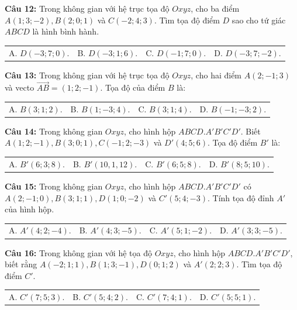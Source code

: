 \documentclass[12pt]{article}
\begin{document}
	\vspace{2mm}
	\noindent \textbf{Câu 12:} Trong không gian với hệ trục tọa độ $Oxyz$, cho ba điểm $A(1; 3; -2), B(2; 0; 1)$ và $C(-2; 4; 3)$. Tìm tọa độ điểm $D$ sao cho tứ giác $ABCD$ là hình bình hành. \\
	\noindent
	\begin{tabular}{p{} p{} p{} p{}}
		A. $D(-3; 7; 0)$. & B. $D(-3; 1; 6)$. & C. $D(-1; 7; 0)$. & D. $D(-3; 7; -2)$.
	\end{tabular}
	
	\vspace{2mm}
	\noindent \textbf{Câu 13:} Trong không gian với hệ trục tọa độ $Oxyz$, cho hai điểm $A(2; -1; 3)$ và vecto $\vec{AB} = (1; 2; -1)$. Tọa độ của điểm $B$ là: \\
	\noindent
	\begin{tabular}{p{} p{} p{} p{}}
		A. $B(3; 1; 2)$. & B. $B(1; -3; 4)$. & C. $B(3; 1; 4)$. & D. $B(-1; -3; 2)$.
	\end{tabular}
	
	\vspace{2mm}
	\noindent \textbf{Câu 14:} Trong không gian $Oxyz$, cho hình hộp $ABCD.A'B'C'D'$. Biết $A(1; 2; -1), B(3; 0; 1), C(-1; 2; -3)$ và $D'(4; 5; 6)$. Tọa độ điểm $B'$ là: \\
	\noindent
	\begin{tabular}{p{} p{} p{} p{}}
		A. $B'(6; 3; 8)$. & B. $B'(10,1,12)$. & C. $B'(6; 5; 8)$. & D. $B'(8; 5; 10)$.
	\end{tabular}
	
	\vspace{2mm}
	\noindent \textbf{Câu 15:} Trong không gian $Oxyz$, cho hình hộp $ABCD.A'B'C'D'$ có $A(2; -1; 0), B(3; 1; 1), D(1; 0; -2)$ và $C'(5; 4; -3)$. Tính tọa độ đỉnh $A'$ của hình hộp. \\
	\noindent
	\begin{tabular}{p{} p{} p{} p{}}
		A. $A'(4; 2; -4)$. & B. $A'(4; 3; -5)$. & C. $A'(5;1;-2)$. & D. $A'(3; 3; -5)$.
	\end{tabular}
	
	\vspace{2mm}
	\noindent \textbf{Câu 16:} Trong không gian với hệ tọa độ $Oxyz$, cho hình hộp $ABCD.A'B'C'D'$, biết rằng $A(-2; 1; 1), B(1; 3; -1), D(0; 1; 2)$ và $A'(2; 2; 3)$. Tìm tọa độ điểm $C'$. \\
	\noindent
	\begin{tabular}{p{} p{} p{} p{}}
		A. $C'(7; 5; 3)$. & B. $C'(5; 4; 2)$. & C. $C'(7; 4; 1)$. & D. $C'(5; 5; 1)$.
	\end{tabular}
	
\end{document}
